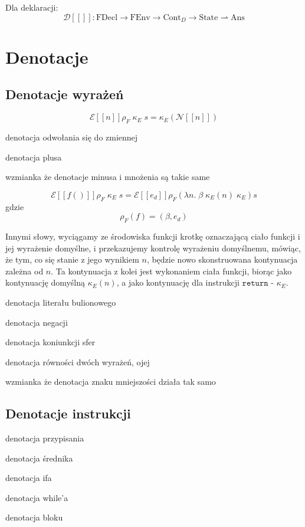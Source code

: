 \documentclass[a4paper]{article}
\begin{document}
Dla deklaracji:
$$
\mathcal{D}[\![]\!]: \text{FDecl} \longrightarrow \text{FEnv} \longrightarrow \text{Cont}_D \longrightarrow \text{State} \rightharpoonup \text{Ans}
$$


\section*{Denotacje}

\subsection*{Denotacje wyrażeń}

$$
\mathcal{E}[\![n]\!] \rho_F \; \kappa_E \; s = \kappa_E(\mathcal{N}[\![n]\!])
$$


denotacja odwołania się do zmiennej

denotacja plusa

wzmianka że denotacje minusa i mnożenia są takie same

$$
\mathcal{E}[\![ f() ]\!] \rho_F \; \kappa_E \; s = \mathcal{E}[\![ e_d ]\!] \rho_F (\lambda n. \; \beta \; \kappa_E(n) \; \kappa_E) s
$$
gdzie
$$
\rho_F(f) = (\beta, e_d)
$$

Innymi słowy, wyciągamy ze środowiska funkcji krotkę oznaczającą ciało funkcji i jej wyrażenie domyślne, i przekazujemy kontrolę wyrażeniu domyślnemu, mówiąc, że tym, co się stanie z jego wynikiem $n$, będzie nowo skonstruowana kontynuacja zależna od $n$. Ta kontynuacja z kolei jest wykonaniem ciała funkcji, biorąc jako kontynuację domyślną $\kappa_E(n)$, a jako kontynuację dla instrukcji $\texttt{return}$ - $\kappa_E$.


denotacja literału bulionowego

denotacja negacji

denotacja koniunkcji sfer

denotacja równości dwóch wyrażeń, ojej

wzmianka że denotacja znaku mniejszości działa tak samo

\subsection*{Denotacje instrukcji}

denotacja przypisania

denotacja średnika

denotacja ifa

denotacja while'a

denotacja bloku
\end{document}
